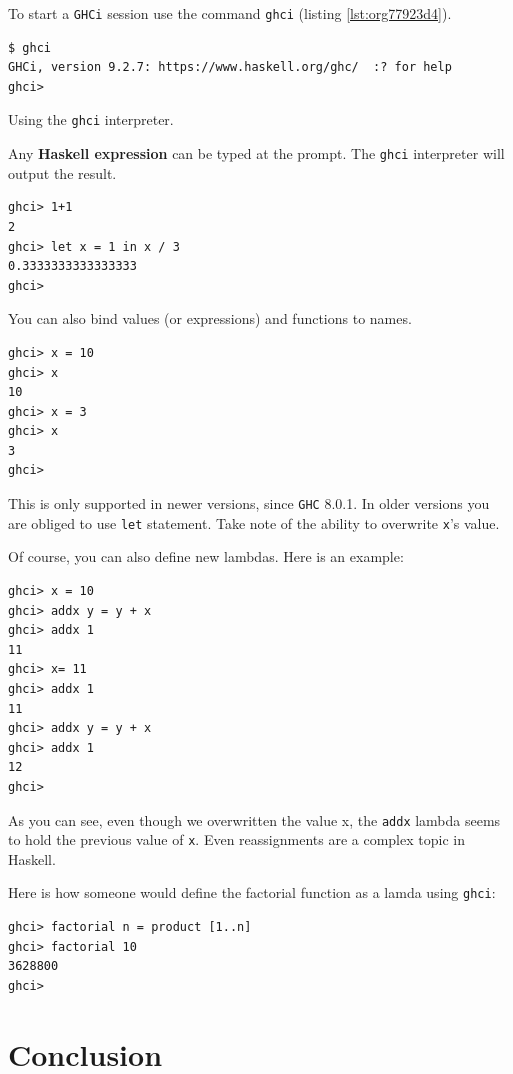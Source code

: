 \documentclass[a4paper, titlepage, twoside]{article}
\begin{document}
To start a \texttt{GHCi} session use the command \texttt{ghci} (listing \ref{lst:org77923d4}).

\begin{listing}[H]
\begin{verbatim}
$ ghci
GHCi, version 9.2.7: https://www.haskell.org/ghc/  :? for help
ghci>
\end{verbatim}
\caption{\label{lst:org77923d4}Using the \texttt{ghci} interpreter.}
\end{listing}

Any \textbf{Haskell expression} can be typed at the prompt. The \texttt{ghci} interpreter will output the result.

\begin{verbatim}
ghci> 1+1
2
ghci> let x = 1 in x / 3
0.3333333333333333
ghci>
\end{verbatim}

You can also bind values (or expressions) and functions to names.

\begin{verbatim}
ghci> x = 10
ghci> x
10
ghci> x = 3
ghci> x
3
ghci>
\end{verbatim}

This is only supported in newer versions, since \texttt{GHC} 8.0.1. In older versions you are obliged to use \texttt{let} statement. Take note of the ability to overwrite \texttt{x}'s value.

Of course, you can also define new lambdas. Here is an example:

\begin{verbatim}
ghci> x = 10
ghci> addx y = y + x
ghci> addx 1
11
ghci> x= 11
ghci> addx 1
11
ghci> addx y = y + x
ghci> addx 1
12
ghci> 
\end{verbatim}

As you can see, even though we overwritten the value x, the \texttt{addx} lambda seems to hold the previous value of \texttt{x}. Even reassignments are a complex topic in Haskell.

Here is how someone would define the factorial function as a lamda using \texttt{ghci}:

\begin{verbatim}
ghci> factorial n = product [1..n]
ghci> factorial 10
3628800
ghci>
\end{verbatim}

\section{Conclusion}
\label{sec:org363f151}
\end{document}
